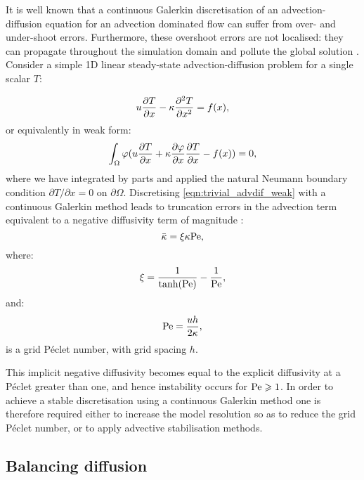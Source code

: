 It is well known that a continuous Galerkin discretisation of an
advection-diffusion equation for an advection dominated flow can suffer from
over- and under-shoot errors. Furthermore, these overshoot errors are not
localised: they can propagate throughout the simulation domain and pollute the
global solution \citep{hughes1987}. Consider a simple 1D linear steady-state
advection-diffusion problem for a single scalar $T$:

\begin{equation}\label{eqn:trivial_advdif}
  u \frac{\partial T}{\partial x} - \kappa \frac{\partial^2T}{\partial x^2} = f(x),
\end{equation}
or equivalently in weak form:
\begin{equation}\label{eqn:trivial_advdif_weak}
  \int_\Omega \varphi (u \frac{\partial T}{\partial x} + \kappa \frac{\partial\varphi}{\partial x} \frac{\partial T}{\partial x} - f(x)) = 0,
\end{equation}
where we have integrated by parts and applied the natural Neumann boundary
condition $\partial T / \partial x = 0$ on $\partial \Omega$.
Discretising \eqref{eqn:trivial_advdif_weak} with a continuous Galerkin method
leads to truncation errors in the advection term equivalent to a negative
diffusivity term of magnitude \citep{DoneaBook}:
\begin{equation}\label{eqn:cg_implicit_diffusivity}
  \bar{\kappa} = \xi \kappa \mathrm{Pe},
\end{equation}
where:
\begin{equation}\label{eqn:xi_parameter}
  \xi = \frac{1}{\tanh(\mathrm{Pe})} - \frac{1}{\mathrm{Pe}},
\end{equation}
and:
\begin{equation}\label{eqn:grid_pe}
  \mathrm{Pe} = \frac{u h}{2 \kappa},
\end{equation}
is a grid P\'eclet number, with grid spacing $h$.

This implicit negative diffusivity becomes
equal to the explicit diffusivity at a P\'eclet greater than one, and hence
instability occurs for $\mathrm{Pe} \geqslant 1$. In order to achieve a stable discretisation
using a continuous Galerkin method one is therefore required either to increase
the model resolution so as to reduce the grid P\'eclet number, or to apply
advective stabilisation methods.

\subsection{Balancing diffusion}\label{sec:balancing_diffusion}

